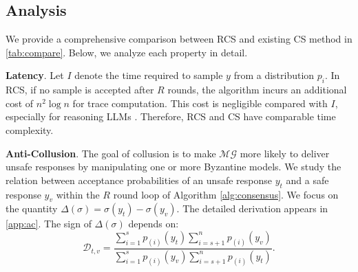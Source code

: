 \subsection{Analysis}
We provide a comprehensive comparison between RCS and existing CS method in \autoref{tab:compare}. Below, we analyze each property in detail.

\begin{table}
\centering
 \caption{A comprehensive comparison between our proposed RCS and existing method.}
    \label{tab:compare}
\end{table}


\noindent
\textbf{Latency}. Let $I$ denote the time required to sample $y$ from a distribution $p_i$.
In RCS, if no sample is accepted after $R$ rounds, the algorithm incurs an additional cost of $n^2 \log n$ for trace computation. This cost is negligible compared with $I$, especially for reasoning LLMs \citep{chen2025towards}. Therefore, RCS and CS have comparable time complexity.



\noindent
\textbf{Anti-Collusion}. The goal of collusion is to make $\mathcal{MG}$ more likely to deliver unsafe responses by manipulating one or more Byzantine models. We study the relation between acceptance probabilities of an unsafe response $y_t$ and a safe response $y_v$ within the $R$ round loop of Algorithm \ref{alg:consensus}. We focus on the quantity $\Delta(\sigma) = \sigma(y_t) - \sigma(y_v)$. The detailed derivation appears in \autoref{app:ac}. The sign of $\Delta(\sigma)$ depends on:
\[
\mathcal{D}_{t,v} =
\frac{
\sum_{i = 1}^{s} p_{(i)}(y_t) \sum_{i = s+1}^{n} p_{(i)}(y_v)
}{
\sum_{i = 1}^{s} p_{(i)}(y_v) \sum_{i = s+1}^{n} p_{(i)}(y_t)
}.
\]


